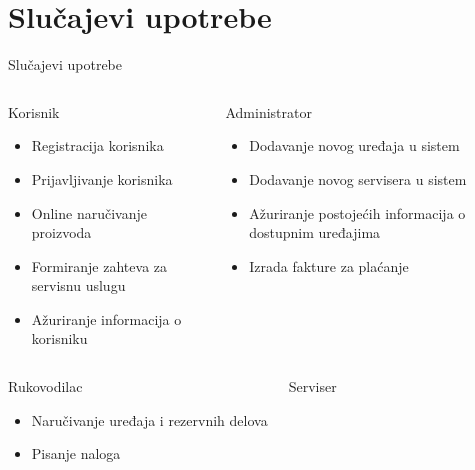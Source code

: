 \documentclass[9pt]{beamer}
\begin{document}
\section{Slučajevi upotrebe}
\begin{frame}{Slučajevi upotrebe}
    \begin{center}
    \begin{columns}
            \begin{alertblock}{Korisnik}
            \begin{itemize}
                \item Registracija korisnika
                \item Prijavljivanje korisnika
                \item Online naručivanje proizvoda
                \item Formiranje zahteva za servisnu uslugu
                \item Ažuriranje informacija o korisniku
            \end{itemize}
            \end{alertblock}
            \begin{alertblock}{Administrator}
            \begin{itemize}
                \item Dodavanje novog uređaja u sistem
                \item Dodavanje novog servisera u sistem
                \item Ažuriranje postojećih informacija o dostupnim uređajima
                \item Izrada fakture za plaćanje
            \end{itemize}
            \end{alertblock}
        \end{columns}
        \begin{columns}
            \begin{alertblock}{Rukovodilac}
            \begin{itemize}
                \item Naručivanje uređaja i rezervnih delova
                \item Pisanje naloga
            \end{itemize}
            \end{alertblock}
            \begin{alertblock}{Serviser}

\end{alertblock}
\end{columns}
\end{center}
\end{frame}
\end{document}
